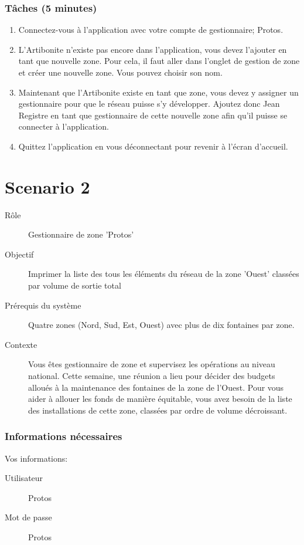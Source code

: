 \documentclass[a4paper, 11pt]{article}
\begin{document}
    \subsubsection*{Tâches (5 minutes)}
        \begin{enumerate}
            \item Connectez-vous à l'application avec votre compte de gestionnaire; Protos.
            \item L’Artibonite n’existe pas encore dans l'application, vous devez l’ajouter en tant que nouvelle zone. Pour cela, il faut aller dans l’onglet de gestion de zone et créer une nouvelle zone. Vous pouvez choisir son nom.
            \item Maintenant que l’Artibonite existe en tant que zone, vous devez y assigner un gestionnaire pour que le réseau puisse s’y développer. Ajoutez donc Jean Registre en tant que gestionnaire de cette nouvelle zone afin qu’il puisse se connecter à l’application.
            \item Quittez l’application en vous déconnectant pour revenir à l’écran d’accueil.
        \end{enumerate}
\newpage

\section*{Scenario 2}
    \begin{description}
        \item[Rôle] Gestionnaire de zone 'Protos'
        \item[Objectif] Imprimer la liste des tous les éléments du réseau de la zone 'Ouest' classées par volume de sortie total
        \item[Prérequis du système] Quatre zones (Nord, Sud, Est, Ouest) avec plus de dix fontaines par zone.
        \item[Contexte] Vous êtes gestionnaire de zone et supervisez les opérations au niveau national. Cette semaine, une réunion a lieu pour décider des budgets alloués à la maintenance des fontaines de la zone de l'Ouest. Pour vous aider à allouer les fonds de manière équitable, vous avez besoin de la liste des installations de cette zone, classées par ordre de volume décroissant.
    \end{description}

    \subsubsection*{Informations nécessaires}
        Vos informations:
        \begin{description}
            \item[Utilisateur] Protos
            \item[Mot de passe] Protos
        \end{description}
\end{document}
